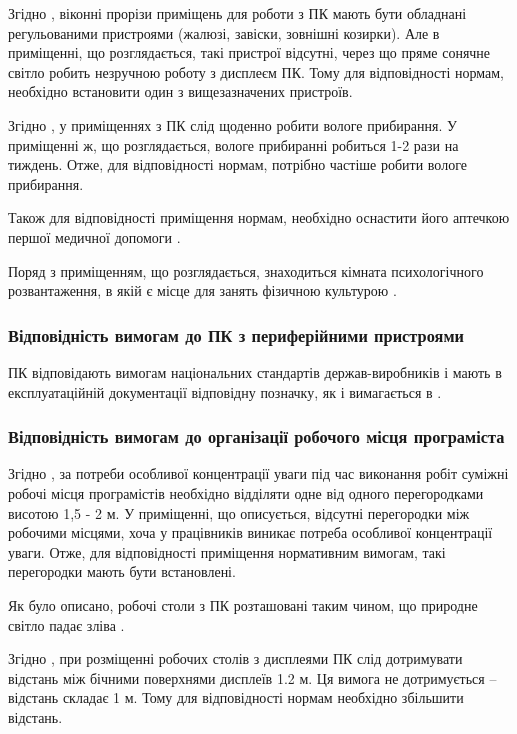 \documentclass[a4paper,12pt]{article}
\begin{document}
Згідно \cite{sanpin798}, віконні прорізи приміщень для роботи з ПК мають бути обладнані регульованими пристроями (жалюзі, завіски, зовнішні козирки). Але в приміщенні, що розглядається, такі пристрої відсутні, через що пряме сонячне світло робить незручною роботу з дисплеєм ПК. Тому для відповідності нормам, необхідно встановити один з вищезазначених пристроїв.

Згідно \cite{sanpin798}, у приміщеннях з ПК слід щоденно робити вологе прибирання. У приміщенні ж, що розглядається, вологе прибиранні робиться 1-2 рази на тиждень. Отже, для відповідності нормам, потрібно частіше робити вологе прибирання.

Також для відповідності приміщення нормам, необхідно оснастити його аптечкою першої медичної допомоги \cite{sanpin798}.

Поряд з приміщенням, що розглядається, знаходиться кімната психологічного розвантаження, в якій є місце для занять фізичною культурою \cite{snip}.

\subsubsection{Відповідність вимогам до ПК з периферійними пристроями}
ПК відповідають вимогам національних стандартів держав-виробників і мають в експлуатаційній документації відповідну позначку, як і вимагається в \cite{npaop1210}.

\subsubsection{Відповідність вимогам до організації робочого місця програміста}
Згідно \cite{npaop1210}, за потреби особливої концентрації уваги під час виконання робіт суміжні робочі місця програмістів необхідно відділяти одне від одного перегородками висотою 1,5 - 2 м. У приміщенні, що описується, відсутні перегородки між робочими місцями, хоча у працівників виникає потреба особливої концентрації уваги. Отже, для відповідності приміщення нормативним вимогам, такі перегородки мають бути встановлені.

Як було описано, робочі столи з ПК розташовані таким чином, що природне світло падає зліва \cite{sanpin798}.

Згідно \cite{sanpin798}, при розміщенні робочих столів з дисплеями ПК слід дотримувати відстань між бічними поверхнями дисплеїв 1.2 м. Ця вимога не дотримується -- відстань складає 1 м. Тому для відповідності нормам необхідно збільшити відстань.
\end{document}
